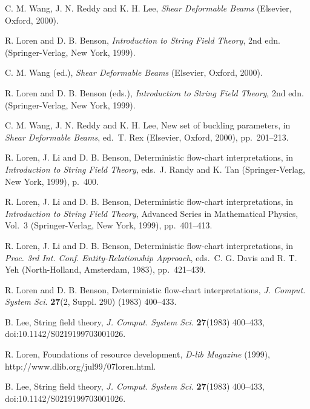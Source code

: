 \documentclass{ws-ijait}
\begin{document}
\begin{thebibliography}{00}
 C. M. Wang, J. N. Reddy and K. H. Lee, {\it Shear Deformable
Beams} (Elsevier, Oxford, 2000).
	
 R. Loren and D. B. Benson, {\it Introduction to String Field
Theory}, 2nd edn. (Springer-Verlag, New York, 1999).

 C. M. Wang (ed.), {\it Shear Deformable Beams}
(Elsevier, Oxford, 2000).

 R. Loren and D. B. Benson (eds.), {\it Introduction to
String Field Theory}, 2nd edn. (Springer-Verlag, New York, 1999).

 C. M. Wang, J. N. Reddy and K. H. Lee, New set of buckling
parameters, in {\it Shear Deformable Beams}, ed.~T. Rex
(Elsevier, Oxford, 2000), pp.~201--213.

 R. Loren, J. Li and D. B. Benson, Deterministic flow-chart
interpretations, in {\it Introduction to String Field Theory},
eds.~J. Randy and K. Tan (Springer-Verlag, New York, 1999), p.~400.

 R. Loren, J. Li and D. B. Benson, Deterministic
flow-chart interpretations, in {\it Introduction to String Field Theory},
Advanced Series in Mathematical Physics, Vol.~3
(Springer-Verlag, New York, 1999), pp.~401--413.

 R. Loren, J. Li and D. B. Benson, Deterministic flow-chart
interpretations, in {\it Proc. 3rd Int. Conf. Entity-Relationship
Approach}, eds.~C. G. Davis and R. T. Yeh (North-Holland, Amsterdam, 1983),
pp.~421--439.

 R. Loren and D. B. Benson, Deterministic flow-chart
interpretations, {\it J. Comput. System Sci}. {\bf 27}(2, Suppl. 290)
(1983) 400--433.

 B. Lee, String field theory, {\it J. Comput. System Sci}.
{\bf 27}(1983) 400--433, doi:10.1142/S0219199703001026.

 R. Loren, Foundations of resource development,
{\it D-lib Magazine} (1999), http://www.dlib.org/jul99/07loren.html.

 B. Lee, String field theory, {\it J. Comput. System Sci}.
{\bf 27}(1983) 400--433, doi:10.1142/S0219199703001026.

\end{thebibliography}
\end{document}
